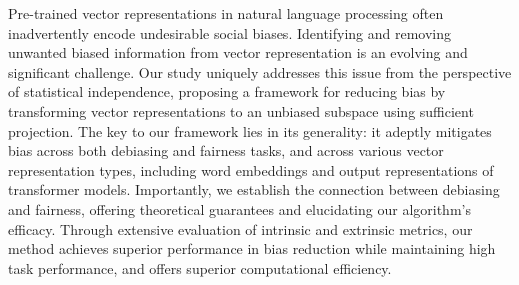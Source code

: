 Pre-trained vector representations in natural language processing often inadvertently encode undesirable social biases. Identifying and removing unwanted biased information from vector representation is an evolving and significant challenge. Our study uniquely addresses this issue from the perspective of statistical independence, proposing a framework for reducing bias by transforming vector representations to an unbiased subspace using sufficient projection. The key to our framework lies in its generality: it adeptly mitigates bias across both debiasing and fairness tasks, and across various vector representation types, including word embeddings and output representations of transformer models. Importantly, we establish the connection between debiasing and fairness, offering theoretical guarantees and elucidating our algorithm's efficacy.  Through extensive evaluation of intrinsic and extrinsic metrics, our method achieves superior performance in bias reduction while maintaining high task performance, and offers superior computational efficiency.